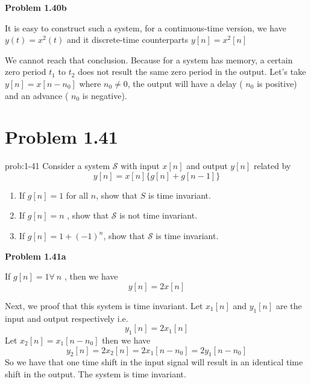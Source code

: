 \documentclass[koma,a4paper,utopia,12pt,listings-color,microtype,paralist,colorlinks,urlcolor=red]{org-article}
\begin{document}
\textbf{Problem 1.40b}

It is easy to construct such a system, for a continuous-time version, we have
\(y(t) = x^{2}(t)\) and it discrete-time counterparts \(y[n] = x^{2}[n]\)

We cannot reach that conclusion. Because for a system has memory, a certain
zero period \(t_{1}\) to \(t_{2}\) does not result the same zero period in the
output. Let's take \(y[n] = x[n-n_{0}]\) where \(n_{0}\neq 0\), the output will
have a delay ( \(n_{0}\) is positive) and an advance ( \(n_{0}\) is negative).
\section{Problem 1.41}
\label{sec:org13d0b92}


\begin{prob}[]{prob:1-41}
Consider a system \(\mathcal{S}\) with input \(x[n]\) and output \(y[n]\)
related by
\begin{equation*}
y[n] = x[n]\{ g[n] + g[n-1] \}
\end{equation*}

\begin{enumerate}
\item If \(g[n] = 1\) for all \(n\), show that \(S\) is time invariant.
\item If \(g[n] = n\) , show that \(\mathcal{S}\) is not time invariant.
\item If \(g[n] = 1 + (-1)^{n}\), show that \(\mathcal{S}\) is time invariant.
\end{enumerate}
\label{prob:1-41}
\end{prob}

\textbf{Problem 1.41a}

If \(g[n] = 1 \forall \ n\) , then we have
\begin{equation*}
y[n] = 2x[n]
\end{equation*}

Next, we proof that this system is time invariant. Let \(x_{1}[n]\) and
\(y_{1}[n]\) are the input and output respectively i.e.
\begin{equation*}
y_{1}[n] = 2x_{1}[n]
\end{equation*}
Let \(x_{2}[n] = x_{1}[n-n_{0}]\) then we have
\begin{equation*}
y_{2}[n] = 2x_{2}[n] = 2x_{1}[n-n_{0}] = 2y_{1}[n-n_{0}]
\end{equation*}
So we have that one time shift in the input signal will result in an identical
time shift in the output. The system is time invariant.
\end{document}
